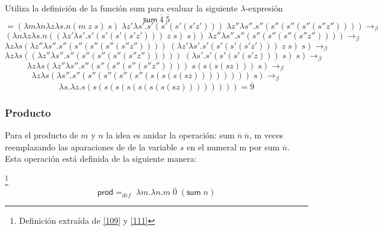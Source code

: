         \begin{exercise}
            Utiliza la definición de la función \textsf{sum} para evaluar la siguiente  $\lambda$-expresión
            \[
                \textsf{sum}\  \overline{4} \; \overline{5} 
            \]
            \[
                = (\lambda m\lambda n\lambda z\lambda s.n(m \; z \; s) \; s) \; \lambda z'\lambda s'.s'(s'(s'(s'z'))) \; \lambda z''\lambda s''.s''(s''(s''(s''(s''z'')))) \rightarrow_\beta 
            \]
            \[
                (\lambda n\lambda z\lambda s.n((\lambda z'\lambda s'.s'(s'(s'(s'z'))) \; z \; s) \; s)) \; \lambda z''\lambda s''.s''(s''(s''(s''(s''z'')))) \rightarrow_\beta 
            \]
            \[
                \lambda z\lambda s(\lambda z''\lambda s''.s''(s''(s''(s''(s''z'')))) \; (\lambda z'\lambda s'.s'(s'(s'(s'z'))) \; z \; s) \; s) \rightarrow_\beta
            \]
            \[
                \lambda z\lambda s((\lambda z''\lambda s''.s''(s''(s''(s''(s''z''))))) \; (\lambda s'.s'(s'(s'(s'z)))  \; s) \; s) \rightarrow_\beta
            \]
            \[
                \lambda z\lambda s(\lambda z''\lambda s''.s''(s''(s''(s''(s''z'')))) \; s(s(s(sz))) \; s) \rightarrow_\beta
            \]
            \[
                \lambda z\lambda s(\lambda s''.s''(s''(s''(s''(s''(s(s(s(sz)))))))) \; s) \rightarrow_\beta
            \]
            \[
                \lambda s.\lambda z .s(s(s(s(s(s(s(s(sz)))))))) = \overline{9}
            \]
        \end{exercise}

        \subsubsection{Producto}
        Para el producto de $m$ y $n$ la idea es anidar la operación: \textsf{sum} $\overline{n}\ \overline{n}$, m veces reemplazando las aparaciones de de la variable $s$ en el numeral m por \textsf{sum} $\overline{n}$. Esta operación está definida de la siguiente manera:

        \begin{definition}\footnote{Definición extraída de \hyperlink{109}{[109]} y  \hyperlink{111}{[111]}}
            $$\textsf{prod} =_{def}  \; \lambda m.\lambda n.m\; \bar{0} \; (\textsf{sum}\;n)$$
        \end{definition}

